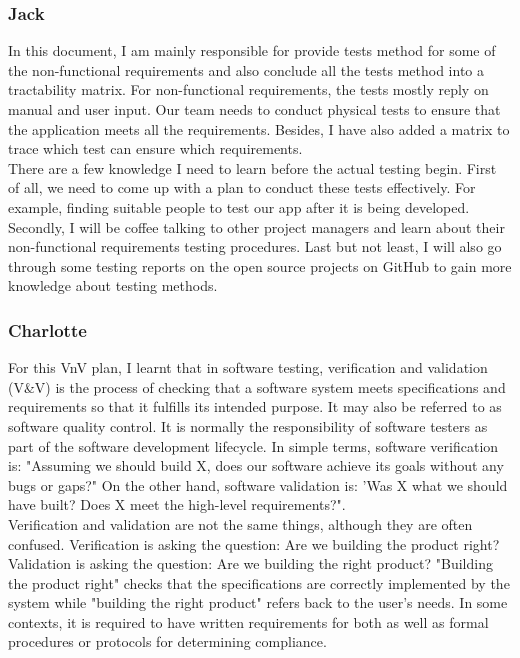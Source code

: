 \documentclass[12pt, titlepage]{article}
\begin{document}
\subsubsection{Jack}
In this document, I am mainly responsible for provide tests method for some of the non-functional requirements and also conclude all the tests method into a tractability matrix. For non-functional requirements, the tests mostly reply on manual and user input. Our team needs to conduct physical tests to ensure that the application meets all the requirements. Besides, I have also added a matrix to trace which test can ensure which requirements.\\

\newline
There are a few knowledge I need to learn before the actual testing begin. First of all, we need to come up with a plan to conduct these tests effectively. For example, finding suitable people to test our app after it is being developed. Secondly, I will be coffee talking to other project managers and learn about their non-functional requirements testing procedures. Last but not least, I will also go through some testing reports on the open source projects on GitHub to gain more knowledge about testing methods.




\subsubsection{Charlotte}
For this VnV plan, I learnt that in software testing, verification and validation (V&V) is the process of checking that a software system meets specifications and requirements so that it fulfills its intended purpose. It may also be referred to as software quality control. It is normally the responsibility of software testers as part of the software development lifecycle. In simple terms, software verification is: "Assuming we should build X, does our software achieve its goals without any bugs or gaps?" On the other hand, software validation is: 'Was X what we should have built? Does X meet the high-level requirements?".\\

Verification and validation are not the same things, although they are often confused. Verification is asking the question: Are we building the product right?
Validation is asking the question: Are we building the right product? "Building the product right" checks that the specifications are correctly implemented by the system while "building the right product" refers back to the user's needs. In some contexts, it is required to have written requirements for both as well as formal procedures or protocols for determining compliance. 
\newline
\end{document}
